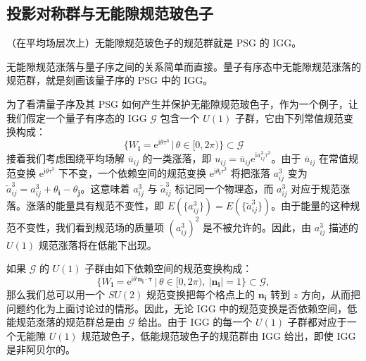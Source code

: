 \subsection{投影对称群与无能隙规范玻色子}

\begin{keypoints}
\item （在平均场层次上）无能隙规范玻色子的规范群就是 PSG 的 IGG。
\end{keypoints}

无能隙规范涨落与量子序之间的关系简单而直接。量子有序态中无能隙规范涨落的规范群，就是刻画该量子序的 PSG 中的 IGG。

为了看清量子序及其 PSG 如何产生并保护无能隙规范玻色子，作为一个例子，让我们假定一个量子有序态的 IGG $\mathcal{G}$ 包含一个 $U(1)$ 子群，它由下列常值规范变换构成：
\begin{equation*}
\{W_{\pmb{i}}=\mathrm{e}^{\mathrm{i}\theta\tau^{3}}\,|\,\theta\in[0,2\pi)\}\subset\mathcal{G}
\end{equation*}
接着我们考虑围绕平均场解 $\bar{u}_{ij}$ 的一类涨落，即 $u_{ij}=\bar{u}_{ij}\mathrm{e}^{\mathrm{i}a_{ij}^{3}\tau^{3}}$。由于 $\bar{u}_{ij}$ 在常值规范变换 $\mathrm{e}^{\mathrm{i}\theta\tau^{3}}$ 下不变，一个依赖空间的规范变换 $\mathrm{e}^{\mathrm{i}\theta_{\pmb{i}}\tau^{3}}$ 将把涨落 $a_{ij}^{3}$ 变为 $\tilde{a}_{ij}^{3}=a_{ij}^{3}+\theta_{\pmb{i}}-\theta_{\pmb{j}}$。这意味着 $a_{ij}^{3}$ 与 $\tilde{a}_{ij}^{3}$ 标记同一个物理态，而 $a_{ij}^{3}$ 对应于规范涨落。涨落的能量具有规范不变性，即 $E(\{a_{ij}^{3}\})=E(\{\tilde{a}_{ij}^{3}\})$。由于能量的这种规范不变性，我们看到规范场的质量项 $(a_{ij}^{3})^{2}$ 是不被允许的。因此，由 $a_{ij}^{3}$ 描述的 $U(1)$ 规范涨落将在低能下出现。

如果 $\mathcal{G}$ 的 $U(1)$ 子群由如下依赖空间的规范变换构成：
\begin{equation*}
\{W_{\pmb{i}}=\mathrm{e}^{\mathrm{i}\theta\,\pmb{n}_{\pmb{i}}\cdot\pmb{\tau}}\,|\,\theta\in[0,2\pi),\ |\pmb{n}_{\pmb{i}}|=1\}\subset\mathcal{G},
\end{equation*}
那么我们总可以用一个 $SU(2)$ 规范变换把每个格点上的 $\pmb{n}_{\pmb{i}}$ 转到 $z$ 方向，从而把问题约化为上面讨论过的情形。因此，无论 IGG 中的规范变换是否依赖空间，低能规范涨落的规范群总是由 $\mathcal{G}$ 给出。由于 IGG 的每一个 $U(1)$ 子群都对应于一个无能隙 $U(1)$ 规范玻色子，低能规范玻色子的规范群由 IGG 给出，即使 IGG 是非阿贝尔的。

